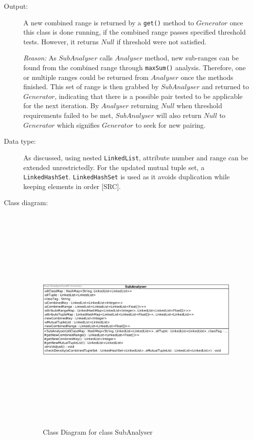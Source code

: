 \begin{description}
\item[Output: ] A new combined range is returned by a \texttt{get()} method to $Generator$ once this class is done running, if the combined range passes specified threshold tests. However, it returns $Null$ if threshold were not satisfied.
  
\textit{Reason: } As $SubAnalyser$ calls $Analyser$ method, new sub-ranges can be found from the combined range through \texttt{maxSum()} analysis. Therefore, one or multiple ranges could be returned from $Analyser$ once the methods finished. This set of range is then grabbed by $SubAnalyser$ and returned to $Generator$, indicating that there is a possible pair tested to be applicable for the next iteration. By $Analyser$ returning $Null$ when threshold requirements failed to be met, $SubAnalyser$ will also return $Null$ to $Generator$ which signifies $Generator$ to seek for new pairing.

\item[Data type: ] As discussed, using nested \texttt{LinkedList}, attribute number and range can be extended unrestrictedly. For the updated mutual tuple set, a \texttt{LinkedHashSet}. \texttt{LinkedHashSet} is used as it avoids duplication while keeping elements in order [SRC]. 

\item[Class diagram: ] 

\begin{figure}[h]
    \centering
    \includegraphics[width=5.5in, height=4.5in]{figures/class_subanalyser}
    \caption[Class Diagram for class SubAnalyser]{Class Diagram for class SubAnalyser}
    \label{fig:figure4_5}
\end{figure}


\end{description}
